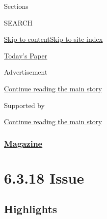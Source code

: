 Sections

SEARCH

\protect\hyperlink{site-content}{Skip to
content}\protect\hyperlink{site-index}{Skip to site index}

\href{https://myaccount.nytimes3xbfgragh.onion/auth/login?response_type=cookie\&client_id=vi}{}

\href{https://www.nytimes3xbfgragh.onion/section/todayspaper}{Today's
Paper}

Advertisement

\protect\hyperlink{after-top}{Continue reading the main story}

Supported by

\protect\hyperlink{after-sponsor}{Continue reading the main story}

\hypertarget{magazine}{%
\subsubsection{\texorpdfstring{\href{/section/magazine}{Magazine}}{Magazine}}\label{magazine}}

\hypertarget{6318-issue}{%
\section{6.3.18 Issue}\label{6318-issue}}

\hypertarget{highlights}{%
\subsection{Highlights}\label{highlights}}

